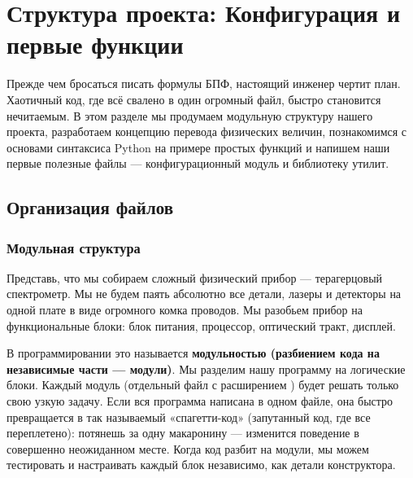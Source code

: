 
\section{Структура проекта: Конфигурация и первые функции}\label{sec:structure}

Прежде чем бросаться писать формулы БПФ, настоящий инженер чертит план. Хаотичный код, где всё свалено в один огромный файл, быстро становится нечитаемым. В этом разделе мы продумаем модульную структуру нашего проекта, разработаем концепцию перевода физических величин, познакомимся с основами синтаксиса Python на примере простых функций и напишем наши первые полезные файлы — конфигурационный модуль и библиотеку утилит.

\subsection{Организация файлов}

\subsubsection{Модульная структура}
Представь, что мы собираем сложный физический прибор --- терагерцовый спектрометр. Мы не будем паять абсолютно все детали, лазеры и детекторы на одной плате в виде огромного комка проводов. Мы разобьем прибор на функциональные блоки: блок питания, процессор, оптический тракт, дисплей.

В программировании это называется \textbf{модульностью (разбиением кода на независимые части --- модули)}. Мы разделим нашу программу на логические блоки. Каждый модуль (отдельный файл с расширением ) будет решать только свою узкую задачу. Если вся программа написана в одном файле, она быстро превращается в так называемый «спагетти-код» (запутанный код, где все переплетено): потянешь за одну макаронину --- изменится поведение в совершенно неожиданном месте. Когда код разбит на модули, мы можем тестировать и настраивать каждый блок независимо, как детали конструктора.

